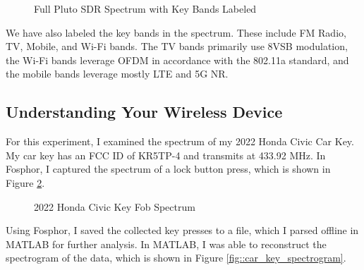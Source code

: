 \documentclass{article}
\begin{document}
\begin{figure}[H]
	\centerline{}
	\caption{Full Pluto SDR Spectrum with Key Bands Labeled}
	\label{fig::full_spectrum_labeled}
\end{figure}

We have also labeled the key bands in the spectrum. These include FM Radio, TV, Mobile, and Wi-Fi bands. The TV bands primarily use 8VSB modulation, the Wi-Fi bands leverage OFDM in accordance with the 802.11a standard, and the mobile bands leverage mostly LTE and 5G NR.

\subsection{Understanding Your Wireless Device}

For this experiment, I examined the spectrum of my 2022 Honda Civic Car Key. My car key has an FCC ID of KR5TP-4 and transmits at 433.92 MHz. In Fosphor, I captured the spectrum of a lock button press, which is shown in Figure \ref{fig::car_key_spectrum}.

\begin{figure}[H]
	\centerline{}
	\caption{2022 Honda Civic Key Fob Spectrum}
	\label{fig::car_key_spectrum}
\end{figure}

Using Fosphor, I saved the collected key presses to a file, which I parsed offline in MATLAB for further analysis. In MATLAB, I was able to reconstruct the spectrogram of the data, which is shown in Figure \ref{fig::car_key_spectrogram}.
\end{document}
